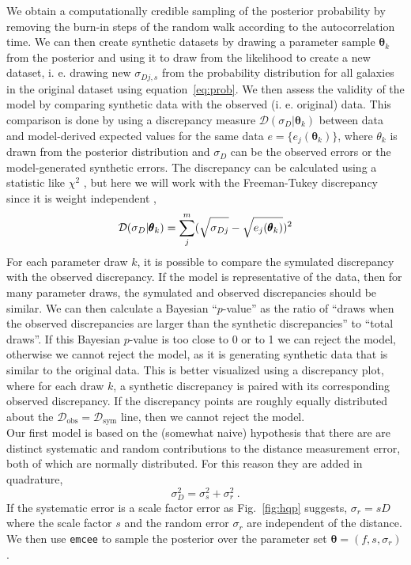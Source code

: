\documentclass[a4paper,fleqn,usenatbib]{mnras}
\begin{document}
We obtain a computationally credible sampling of the posterior probability by removing the burn-in steps of the random walk according to the autocorrelation time. We can then create synthetic datasets by drawing a parameter sample $\pmb{\theta}_k$ from the posterior and using it to draw from the likelihood to create a new dataset, i. e. drawing new $\sigma_{Dj,s}$ from the probability distribution for all galaxies in the original dataset using equation~\ref{eq:prob}. We then assess the validity of the model by comparing synthetic data with the observed (i. e. original) data. This comparison is done by using a discrepancy measure $\mathcal{D}(\sigma_D|\pmb{\theta}_k)$ between data and model-derived expected values for the same data $e=\{e_j(\pmb{\theta}_k)\}$, where $\theta_k$ is drawn from the posterior distribution and $\sigma_D$ can be the observed errors or the model-generated synthetic errors. The discrepancy can be calculated using a statistic like $\chi^2$ \citep{chi2ms,otherdisc}, but here we will work with the Freeman-Tukey discrepancy since it is weight independent \citep{brooks}, 
\[\mathcal{D}(\sigma_D|\pmb{\theta}_k)=\sum_j^m(\sqrt{\sigma_{Dj}\vphantom{e_j(\pmb{\theta}_k)}}-\sqrt{e_j(\pmb{\theta}_k)})^2\]
For each parameter draw $k$, it is possible to compare the symulated discrepancy with the observed discrepancy. If the model is representative of the data, then for many parameter draws, the symulated and observed discrepancies should be similar. We can then calculate a Bayesian ``$p$-value'' as the ratio of ``draws when the observed discrepancies are larger than the synthetic discrepancies'' to ``total draws''. If this Bayesian $p$-value is too close to 0 or to 1 we can reject the model, otherwise we cannot reject the model, as it is generating synthetic data that is similar to the original data. This is better visualized using a discrepancy plot, where for each draw $k$, a synthetic discrepancy is paired with its corresponding observed discrepancy. If the discrepancy points are roughly equally distributed about the $\mathcal{D}_\mathrm{obs}=\mathcal{D}_\mathrm{sym}$ line, then we cannot reject the model.\\


Our first model is based on the (somewhat naive) hypothesis that there are are distinct systematic and random contributions to the distance measurement error, both of which are normally distributed. For this reason they are added in quadrature, 
\[\sigma_D^2=\sigma_s^2+\sigma_r^2\ .\]
If the systematic error is a scale factor error as Fig.~\ref{fig:hqp} suggests, $\sigma_r=sD$ where the scale factor $s$ and the random error $\sigma_r$ are independent of the distance. We then use \texttt{emcee} to sample the posterior over the parameter set $\pmb{\theta}=(f,s,\sigma_r)$. 
\end{document}
